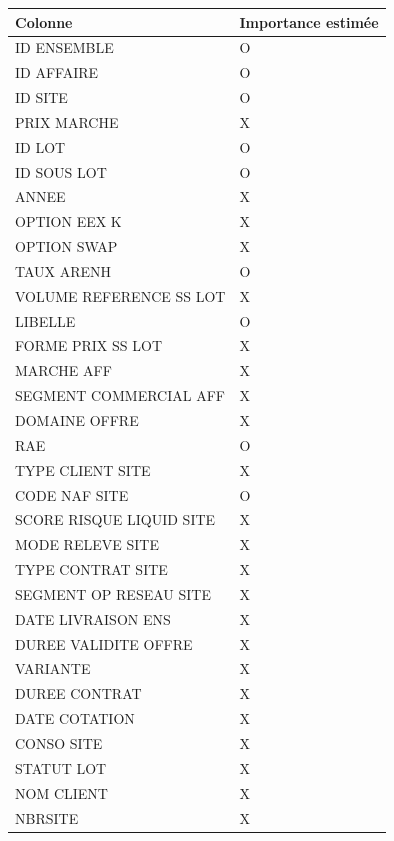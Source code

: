 \documentclass[12pt]{article}
\begin{document}
{\begin{center}
\begin{tabular}{|p{6cm}|p{6cm}|}
\hline
Colonne & Importance estimée  \\
  \hline
ID ENSEMBLE & O  \\
  \hline
ID AFFAIRE & O\\
  \hline
ID SITE &O \\
 \hline
PRIX MARCHE& X \\
  \hline
 ID LOT & O \\
\hline
ID SOUS LOT& O \\
    \hline
 ANNEE& X \\
   \hline
 OPTION EEX K& X  \\
  \hline
 OPTION SWAP & X \\
  \hline
 TAUX ARENH  & O \\
  \hline
VOLUME REFERENCE SS LOT &X\\
  \hline
 LIBELLE&O\\
    
    \hline
 FORME PRIX SS LOT&X\\
    \hline
 MARCHE AFF &X\\
   \hline
   SEGMENT COMMERCIAL AFF& X \\
  \hline
 DOMAINE OFFRE&X\\
  \hline
RAE&O\\
  \hline
 TYPE CLIENT SITE&X \\
  \hline
 CODE NAF SITE&O \\
    \hline
SCORE RISQUE LIQUID SITE&X \\
    \hline
MODE RELEVE SITE&X \\
    \hline
    TYPE CONTRAT SITE&X \\
    \hline
   SEGMENT OP RESEAU SITE & X \\
    \hline
   DATE LIVRAISON ENS& X \\
    \hline
   DUREE VALIDITE OFFRE& X \\
    \hline
   VARIANTE& X \\
    \hline
   DUREE CONTRAT&X \\
    \hline
   DATE COTATION& X\\
    \hline
   CONSO SITE&X \\
    \hline
   STATUT LOT&X\\
    \hline
   NOM CLIENT&X \\
    \hline
   NBRSITE &X   \\
    \hline
\end{tabular}
\end{center}

}
\end{document}
